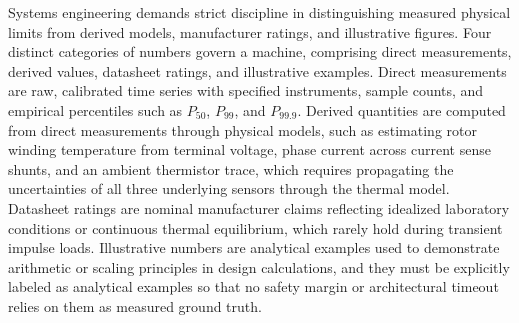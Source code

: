 \documentclass[
  letterpaper,
  DIV=11,
  numbers=noendperiod]{scrartcl}
\begin{document}
Systems engineering demands strict discipline in distinguishing measured
physical limits from derived models, manufacturer ratings, and
illustrative figures. Four distinct categories of numbers govern a
machine, comprising direct measurements, derived values, datasheet
ratings, and illustrative examples. Direct measurements are raw,
calibrated time series with specified instruments, sample counts, and
empirical percentiles such as \(P_{50}\), \(P_{99}\), and \(P_{99.9}\).
Derived quantities are computed from direct measurements through
physical models, such as estimating rotor winding temperature from
terminal voltage, phase current across current sense shunts, and an
ambient thermistor trace, which requires propagating the uncertainties
of all three underlying sensors through the thermal model. Datasheet
ratings are nominal manufacturer claims reflecting idealized laboratory
conditions or continuous thermal equilibrium, which rarely hold during
transient impulse loads. Illustrative numbers are analytical examples
used to demonstrate arithmetic or scaling principles in design
calculations, and they must be explicitly labeled as analytical examples
so that no safety margin or architectural timeout relies on them as
measured ground truth.
\end{document}
